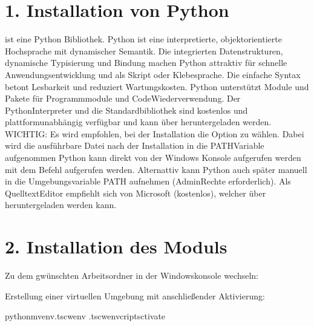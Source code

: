 \documentclass[letterpaper,10pt,english]{sphinxmanual}
\begin{document}
\section{1. Installation von Python}
\label{\detokenize{source/Installation:installation-von-python}}
\sphinxAtStartPar
{} ist eine Python Bibliothek. Python ist eine interpretierte, objektorientierte Hochsprache mit dynamischer Semantik.
Die integrierten Datenstrukturen, dynamische Typisierung und Bindung machen Python attraktiv für schnelle Anwendungsentwicklung
und als Skript\sphinxhyphen{} oder Klebesprache. Die einfache Syntax betont Lesbarkeit und reduziert Wartungskosten.
Python unterstützt Module und Pakete für Programmmodule und Code\sphinxhyphen{}Wiederverwendung.
Der Python\sphinxhyphen{}Interpreter und die Standardbibliothek sind kostenlos und plattformunabhängig verfügbar und kann über
 heruntergeladen werden.
WICHTIG: Es wird empfohlen, bei der Installation die Option  zu wählen.
Dabei wird die ausführbare Datei nach der Installation in die PATH\sphinxhyphen{}Variable aufgenommen Python kann direkt von der Windows Konsole aufgerufen werden mit dem Befehl  aufgerufen werden.
Alternattiv kann Python auch später manuell in die Umgebungsvariable PATH aufnehmen (Admin\sphinxhyphen{}Rechte erforderlich).
Als Quelltext\sphinxhyphen{}Editor empfiehlt sich  von Microsoft (kostenlos), welcher über 
heruntergeladen werden kann.


\section{2. Installation des Moduls}
\label{\detokenize{source/Installation:installation-des-moduls}}
\sphinxAtStartPar
Zu dem gwünschten Arbeitsordner in der Windowskonsole wechseln:

\begin{sphinxVerbatim}[commandchars=\\\{\}]
\PYGZdl{}
\end{sphinxVerbatim}

\sphinxAtStartPar
Erstellung einer virtuellen Umgebung mit anschließender Aktivierung:

\begin{sphinxVerbatim}[commandchars=\\\{\}]
\PYGZdl{}python\PYGZhy{}mvenv.tscw\PYGZus{}env
\PYGZdl{}.tscw\PYGZus{}envcriptsctivate
\end{sphinxVerbatim}
\end{document}

